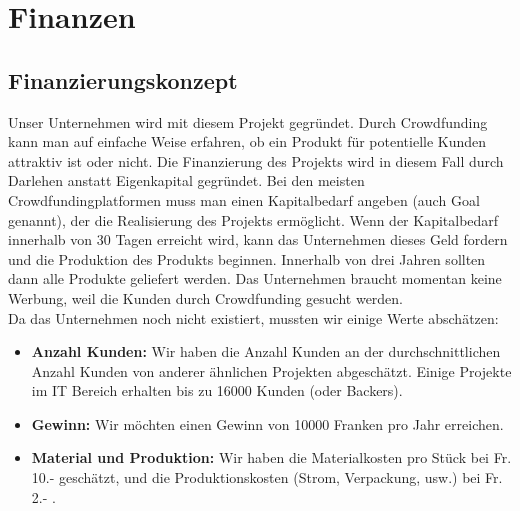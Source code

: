 \chapter{Finanzen}
\label{chap:finanzen}

\section{Finanzierungskonzept}
Unser Unternehmen wird mit diesem Projekt gegr\"undet. Durch Crowdfunding kann man auf einfache Weise erfahren, ob ein Produkt f\"ur potentielle Kunden attraktiv ist oder nicht. Die Finanzierung des Projekts wird in diesem Fall durch Darlehen anstatt Eigenkapital gegr\"undet. Bei den meisten Crowdfundingplatformen muss man einen Kapitalbedarf angeben (auch Goal genannt), der die Realisierung des Projekts erm\"oglicht. Wenn der Kapitalbedarf innerhalb von 30 Tagen erreicht wird, kann das Unternehmen dieses Geld fordern und die Produktion des Produkts beginnen. Innerhalb von drei Jahren sollten dann alle Produkte geliefert werden. Das Unternehmen braucht momentan keine Werbung, weil die Kunden durch Crowdfunding gesucht werden.\\
Da das Unternehmen noch nicht existiert, mussten wir einige Werte absch\"atzen:\\
\begin{itemize}
\item \textbf{Anzahl Kunden:} Wir haben die Anzahl Kunden an der durchschnittlichen Anzahl Kunden von anderer \"ahnlichen Projekten abgesch\"atzt. Einige Projekte im IT Bereich erhalten bis zu 16000 Kunden (oder Backers). 
\item \textbf{Gewinn:} Wir m\"ochten einen Gewinn von 10000 Franken pro Jahr erreichen.
\item \textbf{Material und Produktion:} Wir haben die Materialkosten pro St\"uck bei Fr. 10.- gesch\"atzt, und die Produktionskosten (Strom, Verpackung, usw.) bei Fr. 2.- .
\end{itemize}

